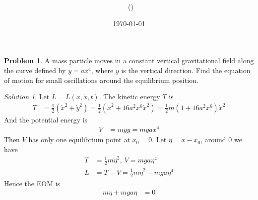 \documentclass[twoside,11pt]{article}
\title{{\lms \Code \ \Ass}}
\author{\lms \name \ (\href{mailto:\mail}{\mail})}
\date{\sffamily \today}
\makeatletter
\newcommand{\lms}{\fontfamily{lmss}\selectfont} %
\theoremstyle{definition}
\newtheorem{problem}{\lms Problem}
\theoremstyle{remark}
\newtheorem*{solution}{Solution}
\renewcommand{\maketitle}{\bgroup\setlength{\parindent}{0pt}
\begin{flushleft}
  \textbf{\Large\@title}

  \@author
\end{flushleft}\egroup
}
\makeatother
\begin{document}
\maketitle
\thispagestyle{title}

\begin{problem}
A mass particle moves in a constant vertical gravitational field along the curve
defined by $y=ax^4$, where $y$ is the vertical direction.
Find the equation of motion for small oscillations around the equilibrium position.
\end{problem}
\begin{solution}
Let $L=L(x,\dot x, t)$.
The kinetic energy $T$ is
\begin{align*}
    T &= \frac{1}{2}(\dot x^2 + \dot y^2) = \frac{1}{2}(\dot x^2 + 16a^2x^6\dot x^2)
    = \frac{1}{2}m(1 + 16a^2x^6) \dot x^2
\end{align*}
And the potential energy is
\begin{align*}
    V &= mgy = mgax^4
\end{align*}
Then $V$ has only one equilibrium point at $x_0=0$.
Let $\eta = x-x_0$, around $0$ we have
\begin{align*}
    T &= \frac{1}{2}m \dot \eta^2, ~V= mga\eta^4\\
    L &= T - V = \frac{1}{2}m\dot\eta^2 - mga\eta^4
\end{align*}
Hence the EOM is 
\begin{align*}
    m\ddot \eta + mga \eta &= 0
\end{align*}
\end{solution}
\end{document}
